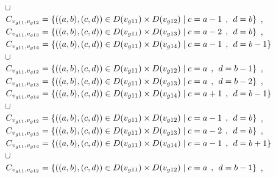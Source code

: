 \\$\cup$
\\$C_{v_{g11},v_{g12}}=\{((a,b),(c,d))\in D(v_{g11}) \times D(v_{g12})\mid c = a - 1\hspace{1ex} , \hspace{1ex}  d = b   \}$ , 
\\$C_{v_{g11},v_{g13}}=\{((a,b),(c,d))\in D(v_{g11}) \times D(v_{g13})\mid c = a - 2\hspace{1ex} , \hspace{1ex}  d = b   \}$ , 
\\$C_{v_{g11},v_{g14}}=\{((a,b),(c,d))\in D(v_{g11}) \times D(v_{g14})\mid c = a - 1\hspace{1ex} , \hspace{1ex}  d = b - 1 \}$  
\\$\cup$
\\$C_{v_{g11},v_{g12}}=\{((a,b),(c,d))\in D(v_{g11}) \times D(v_{g12})\mid c = a   \hspace{1ex} , \hspace{1ex}  d = b - 1 \}$ , 
\\$C_{v_{g11},v_{g13}}=\{((a,b),(c,d))\in D(v_{g11}) \times D(v_{g13})\mid c = a   \hspace{1ex} , \hspace{1ex}  d = b - 2 \}$ , 
\\$C_{v_{g11},v_{g14}}=\{((a,b),(c,d))\in D(v_{g11}) \times D(v_{g14})\mid c = a + 1\hspace{1ex} , \hspace{1ex}  d = b - 1 \}$  
\\$\cup$
\\$C_{v_{g11},v_{g12}}=\{((a,b),(c,d))\in D(v_{g11}) \times D(v_{g12})\mid c = a - 1\hspace{1ex} , \hspace{1ex}  d = b    \}$ , 
\\$C_{v_{g11},v_{g13}}=\{((a,b),(c,d))\in D(v_{g11}) \times D(v_{g13})\mid c = a - 2\hspace{1ex} , \hspace{1ex}  d = b    \}$ , 
\\$C_{v_{g11},v_{g14}}=\{((a,b),(c,d))\in D(v_{g11}) \times D(v_{g14})\mid c = a - 1\hspace{1ex} , \hspace{1ex}  d = b + 1 \}$  
\\$\cup$
\\$C_{v_{g11},v_{g12}}=\{((a,b),(c,d))\in D(v_{g11}) \times D(v_{g12})\mid c = a  \hspace{1ex} , \hspace{1ex}  d = b - 1 \}$ , 

